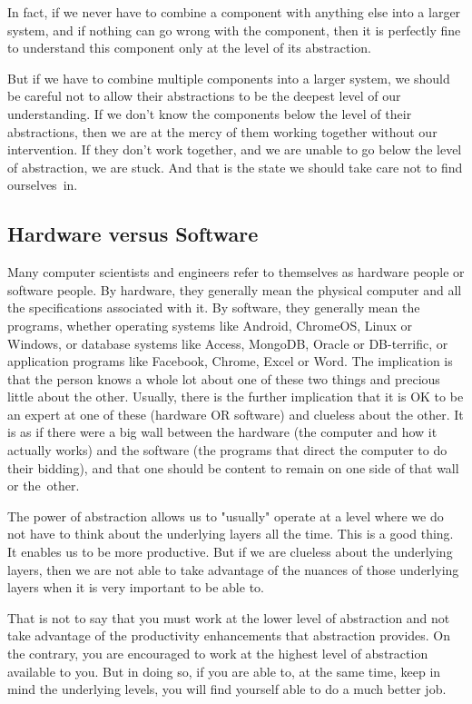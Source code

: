 \documentclass{patt}
\begin{document}
In fact, if we never have to combine a component with anything else into
a larger system, and if nothing can go wrong with the component, then it is
perfectly fine to understand this component only at the level of its
abstraction.

But if we have to combine multiple components into a larger system, we
should be careful not to allow their abstractions to be the deepest level
of our understanding.  If we don't know the components below the level of their
abstractions, then we are at the mercy of them working together without our
intervention.  If they don't work together, and we are unable to go below the
level of abstraction, we are stuck.  And that is the state we should take
care not to find ourselves~in.

\subsection{Hardware versus Software}

Many computer scientists and engineers refer to themselves as hardware
people or software people.  By hardware, they generally mean the
physical computer and all the specifications associated with it.  By
software, they generally mean the programs, whether operating systems
like Android, ChromeOS, Linux or Windows, or database systems like Access, MongoDB, Oracle or DB-terrific, or application programs like Facebook, Chrome, Excel or Word.  The implication is that
the person knows a whole lot about one of these two things and
precious little about the other.  Usually, there is the further
implication that it is OK to be an expert at one of these (hardware OR
software) and clueless about the other.  It is as if there were a big
wall between the hardware (the computer and how it actually works) and
the software (the programs that direct the computer to do their bidding), and
that one should be content to remain on one side of that wall or
the~other.

The power of abstraction allows us to "usually" operate at a level where we
do not have to think about the underlying layers all the time.  This is a
good thing. It enables us to be more productive.  But if we are clueless
about the underlying layers, then we are not able to take advantage of the
nuances of those underlying layers when it is very important to be able to. 

That is not to say that you must work at the lower level of abstraction
and not take advantage of the productivity enhancements that abstraction
provides.  On the contrary, you are encouraged to work at the highest level
of abstraction available to you.  But in doing so, if you are able to, at
the same time, keep in mind the underlying levels, you will find yourself
able to do a much better job. 
\end{document}
